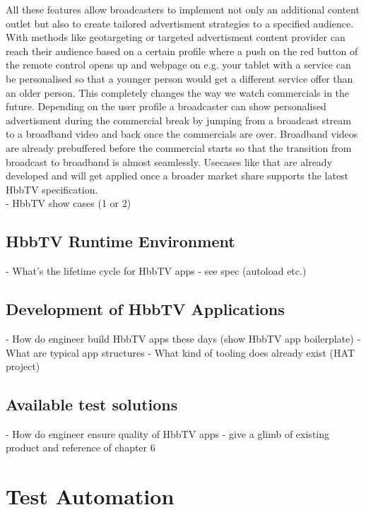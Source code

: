 All these features allow broadcasters to implement not only an additional content outlet but also
to create tailored advertisment strategies to a specified audience. With methods like geotargeting
or targeted advertisment content provider can reach their audience based on a certain profile where
a push on the red button of the remote control opens up and webpage on e.g. your tablet with a
service can be personalised so that a younger person would get a different service offer than an
older person. This completely changes the way we watch commercials in the future. Depending on
the user profile a broadcaster can show personalised advertisment during the commercial break by
jumping from a broadcast stream to a broadband video and back once the commercials are over.
Broadband videos are already prebuffered before the commercial starts so that the transition from
broadcast to broadband is almost seamlessly. Usecases like that are already developed and will
get applied once a broader market share supports the latest HbbTV specification.\\

- HbbTV show cases (1 or 2)

\subsection{HbbTV Runtime Environment\label{sec:hbbtvruntimeenvironment}}

- What's the lifetime cycle for HbbTV apps
- see spec (autoload etc.)

\subsection{Development of HbbTV Applications\label{sec:devofhbbtv}}

- How do engineer build HbbTV apps these days (show HbbTV app boilerplate)
- What are typical app structures
- What kind of tooling does already exist (HAT project)

\subsection{Available test solutions\label{sec:availabletestsolutions}}

- How do engineer ensure quality of HbbTV apps
- give a glimb of existing product and reference of chapter 6

\section{Test Automation\label{sec:testautomation}}

